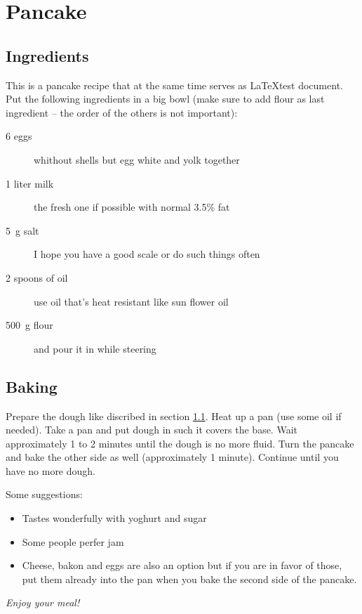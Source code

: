 \documentclass[a4paper]{article}
\begin{document}
\section{Pancake}

\subsection{Ingredients}
\label{ingredients}

This is a pancake recipe that at the same time serves as \LaTeX test document. Put the following ingredients in a big bowl (make sure to add flour as last ingredient -- the order of the others is not important):

\begin{description}
\item[6 eggs] whithout shells but egg white and yolk together
\item[1 liter milk] the fresh one if possible with normal 3.5\% fat
\item[5~g salt] I hope you have a good scale or do such things often
\item[2 spoons of oil] use oil that's heat resistant like sun flower oil
\item[500~g flour] and pour it in while steering
\end{description}


\subsection{Baking}

Prepare the dough like discribed in section \ref{ingredients}.
Heat up a pan (use some oil if needed). Take a pan and put dough in such it covers the base. Wait approximately 1 to 2 minutes until the dough is no more fluid. Turn the pancake and bake the other side as well (approximately 1 minute). Continue until you have no more dough.


Some suggestions:
\begin{itemize}
	\item Tastes wonderfully with yoghurt and sugar
	\item Some people perfer jam
	\item Cheese, bakon and eggs are also an option but if you are in favor of those, put them already into the pan when you bake the second side of the pancake.
\end{itemize}

\emph{Enjoy your meal!}
\end{document}
